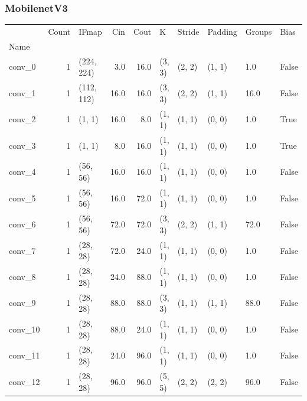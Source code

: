 \subsubsection{MobilenetV3}

\clearpage
\begin{center}
    \begin{tabular}{lrlrrlllll}
        \toprule
        {} &  Count &       IFmap &    Cin &    Cout &       K &  Stride & Padding & Groups &   Bias \\
        Name    &        &             &        &         &         &         &         &        &        \\
        \midrule
        conv\_0  &      1 &  (224, 224) &    3.0 &    16.0 &  (3, 3) &  (2, 2) &  (1, 1) &    1.0 &  False \\
        conv\_1  &      1 &  (112, 112) &   16.0 &    16.0 &  (3, 3) &  (2, 2) &  (1, 1) &   16.0 &  False \\
        conv\_2  &      1 &      (1, 1) &   16.0 &     8.0 &  (1, 1) &  (1, 1) &  (0, 0) &    1.0 &   True \\
        conv\_3  &      1 &      (1, 1) &    8.0 &    16.0 &  (1, 1) &  (1, 1) &  (0, 0) &    1.0 &   True \\
        conv\_4  &      1 &    (56, 56) &   16.0 &    16.0 &  (1, 1) &  (1, 1) &  (0, 0) &    1.0 &  False \\
        conv\_5  &      1 &    (56, 56) &   16.0 &    72.0 &  (1, 1) &  (1, 1) &  (0, 0) &    1.0 &  False \\
        conv\_6  &      1 &    (56, 56) &   72.0 &    72.0 &  (3, 3) &  (2, 2) &  (1, 1) &   72.0 &  False \\
        conv\_7  &      1 &    (28, 28) &   72.0 &    24.0 &  (1, 1) &  (1, 1) &  (0, 0) &    1.0 &  False \\
        conv\_8  &      1 &    (28, 28) &   24.0 &    88.0 &  (1, 1) &  (1, 1) &  (0, 0) &    1.0 &  False \\
        conv\_9  &      1 &    (28, 28) &   88.0 &    88.0 &  (3, 3) &  (1, 1) &  (1, 1) &   88.0 &  False \\
        conv\_10 &      1 &    (28, 28) &   88.0 &    24.0 &  (1, 1) &  (1, 1) &  (0, 0) &    1.0 &  False \\
        conv\_11 &      1 &    (28, 28) &   24.0 &    96.0 &  (1, 1) &  (1, 1) &  (0, 0) &    1.0 &  False \\
        conv\_12 &      1 &    (28, 28) &   96.0 &    96.0 &  (5, 5) &  (2, 2) &  (2, 2) &   96.0 &  False \\

\end{tabular}
\end{center}
